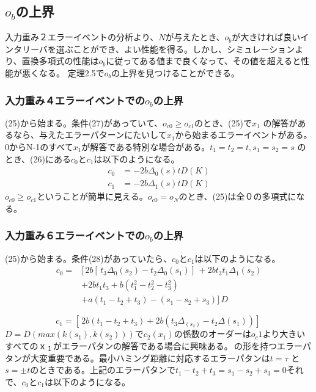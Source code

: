 \documentclass[20 pts]{article}
\begin{document}
\subsection{$o_b$の上界}
入力重み２エラーイベントの分析より、$N$が与えたとき、$o_b$が大きければ良いインタリーバを選ぶことができ、よい性能を得る。しかし、シミュレーションより、置換多項式の性能は$o_b$に従ってある値まで良くなって、その値を超えると性能が悪くなる。
定理2.5で$o_b$の上界を見つけることができる。
\subsubsection{入力重み４エラーイベントでの$o_b$の上界}
(25)から始まる。条件(27)があっていて、$o_{c0}  \geq o_{c1}$のとき、(25)で$x_1$  の解答があるなら、与えたエラーパターンにたいして$x_1$から始まるエラーイベントがある。0からN-1のすべて$x_1$が解答である特別な場合がある。$t_1= t_2=t,s_1=s_2=s$ のとき、(26)にある$c_0$と$c_1$は以下のようになる。
\begin{equation*}
\begin{split}
c_0&=-2b\Delta_0(s)tD(K)\\
c_1&=-2b\Delta_1(s)tD(K)
\end{split}
\end{equation*}
$o_{c0}  \geq o_{c1}$ということが簡単に見える。$o_{c0}=o_N$のとき、(25)は全０の多項式になる。

\subsubsection{入力重み６エラーイベントでの$o_b$の上界}
(25)から始まる。条件(28)があっていたら、$c_0$と$c_1$は以下のようになる。
\begin{equation}\tag{30}
\begin{split}
c_0=&[\, 2b[\,t_3\Delta_0(s_2)-t_2\Delta_0(s_1)]\,+2bt_3t_1\Delta_1(s_2)\\
&+2bt_1t_3+b(t_1^2-t_2^2-t_3^2)\\
&+a(t_1-t_2+t_3)-(s_1-s_2+s_3) ]\,D
\end{split}
\end{equation}

\begin{equation}\tag{31}
c_1=[\, 2b(t_1-t_2+t_3)+2b(t_3\Delta_(s_2)-t_2\Delta(s_1))]\,
\end{equation}
$D=D(max⁡(k(s_1) ,k(s_2)))$で$c_2 (x_1)$の係数のオーダーは$o_c1$より大きいすべての$ｘ_１$がエラーパタンの解答である場合に興味ある。\newline
[\,2t,t,-t,s,-s,2s]\,の形を持つエラーパタンが大変重要である。最小ハミング距離に対応するエラーパタンは$t=\tau$ と
$s=\pm t$のときである。上記のエラーパタンで$t_1-t_2+t_3=s_1-s_2+s_3=0$それで、$c_0$と$c_1$は以下のようになる。
\end{document}
